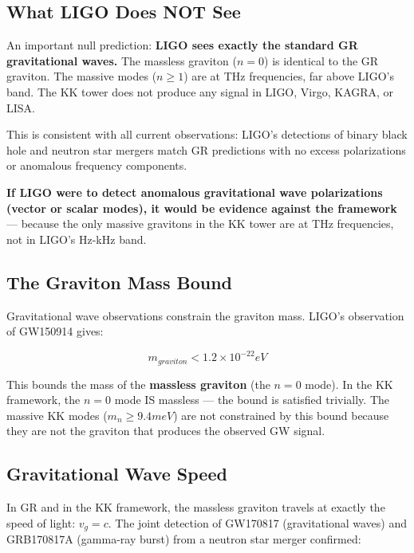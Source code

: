 \documentclass[aps,prd,preprint,superscriptaddress,longbibliography,floatfix]{revtex4-2}
\theoremstyle{remark}
\begin{document}
\subsection{What LIGO Does NOT See}

An important null prediction: \textbf{LIGO sees exactly the standard GR gravitational waves.} The massless graviton ($n = 0$) is identical to the GR graviton. The massive modes ($n \geq 1$) are at THz frequencies, far above LIGO's band. The KK tower does not produce any signal in LIGO, Virgo, KAGRA, or LISA.

This is consistent with all current observations: LIGO's detections of binary black hole and neutron star mergers match GR predictions with no excess polarizations or anomalous frequency components.

\textbf{If LIGO were to detect anomalous gravitational wave polarizations (vector or scalar modes), it would be evidence against the framework} --- because the only massive gravitons in the KK tower are at THz frequencies, not in LIGO's Hz-kHz band.



\subsection{The Graviton Mass Bound}

Gravitational wave observations constrain the graviton mass. LIGO's observation of GW150914 gives:


\begin{equation}
    m_{graviton} < 1.2 \times 10^{-22} eV
\end{equation}
\cite{LIGO2016}

This bounds the mass of the \textbf{massless graviton} (the $n = 0$ mode). In the KK framework, the $n = 0$ mode IS massless --- the bound is satisfied trivially. The massive KK modes ($m_n \geq 9.4 meV$) are not constrained by this bound because they are not the graviton that produces the observed GW signal.



\subsection{Gravitational Wave Speed}

In GR and in the KK framework, the massless graviton travels at exactly the speed of light: $v_g = c$. The joint detection of GW170817 (gravitational waves) and GRB170817A (gamma-ray burst) from a neutron star merger confirmed:
\end{document}
